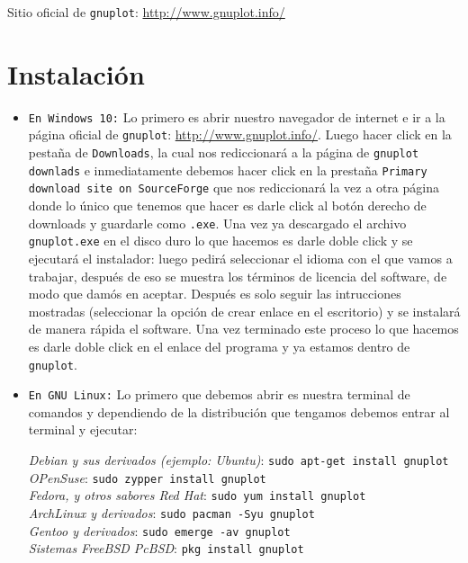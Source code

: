 \documentclass[11.5pt,a4paper]{article}
\begin{document}
Sitio oficial de \texttt{gnuplot}: \url{http://www.gnuplot.info/} 


\section{Instalación}

\begin{itemize}
\item \texttt{En Windows 10:} Lo primero es abrir nuestro navegador de internet e ir a la página oficial de \texttt{gnuplot}: \url{http://www.gnuplot.info/}. Luego hacer click en la pestaña de \texttt{Downloads}, la cual nos rediccionará a la página de \texttt{gnuplot downlads} e inmediatamente debemos hacer click en la prestaña \texttt{Primary download site on SourceForge} que nos rediccionará la vez a otra página donde lo único que tenemos que hacer es darle click al botón derecho de downloads y guardarle como \texttt{.exe}. Una vez ya descargado el archivo \texttt{gnuplot.exe} en el disco duro lo que hacemos es darle doble click y se ejecutará el instalador: luego pedirá seleccionar el idioma con el que vamos a trabajar, después de eso se muestra los términos de licencia del software, de modo que damós en aceptar. Después es solo seguir las intrucciones mostradas (seleccionar la opción de crear enlace en el escritorio) y se instalará de manera rápida el software. Una vez terminado este proceso lo que hacemos es darle doble click en el enlace del programa y ya estamos dentro de \texttt{gnuplot}.    

\item \texttt{En GNU Linux:} Lo primero que debemos abrir es nuestra terminal de comandos y dependiendo de la distribución que tengamos debemos entrar al terminal y ejecutar:

\textit{Debian y sus derivados (ejemplo: Ubuntu)}:\hspace{1.0cm}  \texttt{sudo apt-get install gnuplot}\\
\textit{OPenSuse}:\hspace{5.9cm}  \texttt{sudo zypper install gnuplot}\\
\textit{Fedora, y otros sabores Red Hat}:\hspace{2.6cm}  \texttt{sudo yum install gnuplot}\\
\textit{ArchLinux y derivados}:\hspace{4.0cm}  \texttt{sudo pacman -Syu gnuplot}\\
\textit{Gentoo y derivados}:\hspace{4.5cm} \texttt{sudo emerge -av gnuplot}\\
\textit{Sistemas FreeBSD\/ PcBSD}:\hspace{3.4cm} \texttt{pkg install gnuplot}
\end{itemize}
\end{document}
